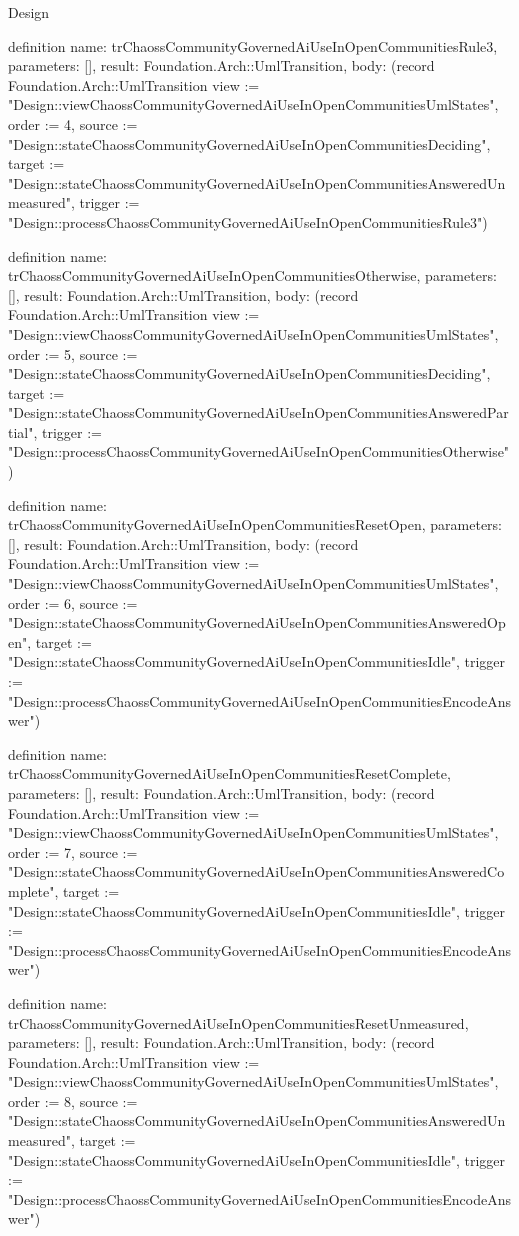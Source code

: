 \begin{lexlean}{Design}
\begin{semanticmodule}
definition{
  name: trChaossCommunityGovernedAiUseInOpenCommunitiesRule3,
  parameters: [],
  result: Foundation.Arch::UmlTransition,
  body: (record Foundation.Arch::UmlTransition {view := "Design::viewChaossCommunityGovernedAiUseInOpenCommunitiesUmlStates", order := 4, source := "Design::stateChaossCommunityGovernedAiUseInOpenCommunitiesDeciding", target := "Design::stateChaossCommunityGovernedAiUseInOpenCommunitiesAnsweredUnmeasured", trigger := "Design::processChaossCommunityGovernedAiUseInOpenCommunitiesRule3"})
}

definition{
  name: trChaossCommunityGovernedAiUseInOpenCommunitiesOtherwise,
  parameters: [],
  result: Foundation.Arch::UmlTransition,
  body: (record Foundation.Arch::UmlTransition {view := "Design::viewChaossCommunityGovernedAiUseInOpenCommunitiesUmlStates", order := 5, source := "Design::stateChaossCommunityGovernedAiUseInOpenCommunitiesDeciding", target := "Design::stateChaossCommunityGovernedAiUseInOpenCommunitiesAnsweredPartial", trigger := "Design::processChaossCommunityGovernedAiUseInOpenCommunitiesOtherwise"})
}

definition{
  name: trChaossCommunityGovernedAiUseInOpenCommunitiesResetOpen,
  parameters: [],
  result: Foundation.Arch::UmlTransition,
  body: (record Foundation.Arch::UmlTransition {view := "Design::viewChaossCommunityGovernedAiUseInOpenCommunitiesUmlStates", order := 6, source := "Design::stateChaossCommunityGovernedAiUseInOpenCommunitiesAnsweredOpen", target := "Design::stateChaossCommunityGovernedAiUseInOpenCommunitiesIdle", trigger := "Design::processChaossCommunityGovernedAiUseInOpenCommunitiesEncodeAnswer"})
}

definition{
  name: trChaossCommunityGovernedAiUseInOpenCommunitiesResetComplete,
  parameters: [],
  result: Foundation.Arch::UmlTransition,
  body: (record Foundation.Arch::UmlTransition {view := "Design::viewChaossCommunityGovernedAiUseInOpenCommunitiesUmlStates", order := 7, source := "Design::stateChaossCommunityGovernedAiUseInOpenCommunitiesAnsweredComplete", target := "Design::stateChaossCommunityGovernedAiUseInOpenCommunitiesIdle", trigger := "Design::processChaossCommunityGovernedAiUseInOpenCommunitiesEncodeAnswer"})
}

definition{
  name: trChaossCommunityGovernedAiUseInOpenCommunitiesResetUnmeasured,
  parameters: [],
  result: Foundation.Arch::UmlTransition,
  body: (record Foundation.Arch::UmlTransition {view := "Design::viewChaossCommunityGovernedAiUseInOpenCommunitiesUmlStates", order := 8, source := "Design::stateChaossCommunityGovernedAiUseInOpenCommunitiesAnsweredUnmeasured", target := "Design::stateChaossCommunityGovernedAiUseInOpenCommunitiesIdle", trigger := "Design::processChaossCommunityGovernedAiUseInOpenCommunitiesEncodeAnswer"})
}


\end{semanticmodule}
\end{lexlean}
